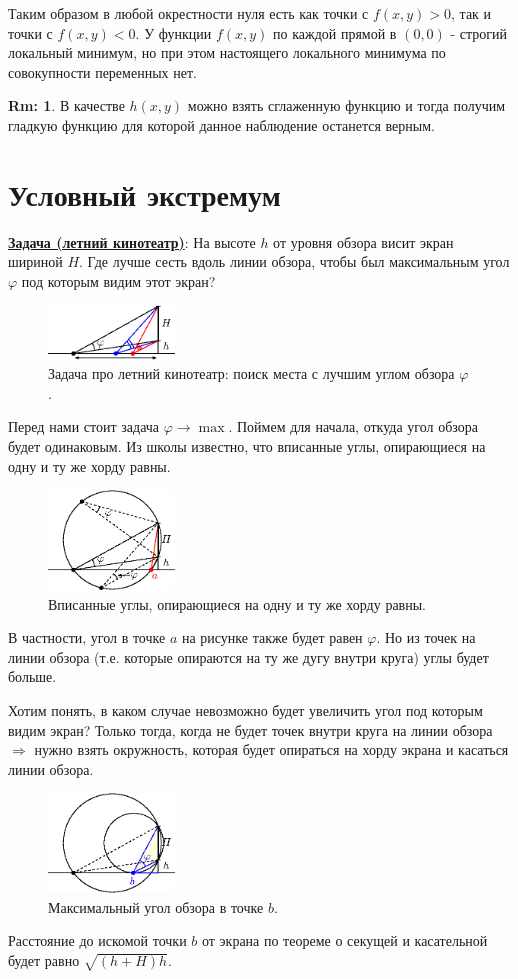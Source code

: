 \documentclass[12pt]{article}
\theoremstyle{definition}
\newtheorem{rem}{Rm:}
\begin{document}
Таким образом в любой окрестности нуля есть как точки с $f(x,y) > 0$, так и точки с $f(x,y) < 0$. У функции $f(x,y)$ по каждой прямой в $(0,0)$ - строгий локальный минимум, но при этом настоящего локального минимума по совокупности переменных нет.
\begin{rem}
	В качестве $h(x,y)$ можно взять сглаженную функцию и тогда получим гладкую функцию для которой данное наблюдение останется верным.
\end{rem}

\section*{Условный экстремум}
\textbf{\uline{Задача (летний кинотеатр)}}: На высоте $h$ от уровня обзора висит экран шириной $H$. Где лучше сесть вдоль линии обзора, чтобы был максимальным угол $\varphi$ под которым видим этот экран?
\begin{figure}[H]
	\centering
	\includegraphics[width=0.3\textwidth]{18_5.eps}
	\caption{Задача про летний кинотеатр: поиск места с лучшим углом обзора $\varphi$.}
	\label{18_5}
\end{figure}
Перед нами стоит задача $\varphi \to \max$. Поймем для начала, откуда угол обзора будет одинаковым. Из школы известно, что вписанные углы, опирающиеся на одну и ту же хорду равны.
\begin{figure}[H]
	\centering
	\includegraphics[width=0.3\textwidth]{18_6.eps}
	\caption{Вписанные углы, опирающиеся на одну и ту же хорду равны.}
	\label{18_6}
\end{figure}
В частности, угол в точке $a$ на рисунке также будет равен $\varphi$. Но из точек на линии обзора (т.е. которые опираются на ту же дугу внутри круга) углы будет больше. 

Хотим понять, в каком случае невозможно будет увеличить угол под которым видим экран? Только тогда, когда не будет точек внутри круга на линии обзора $\Rightarrow$ нужно взять окружность, которая будет опираться на хорду экрана и касаться линии обзора.
\begin{figure}[H]
	\centering
	\includegraphics[width=0.3\textwidth]{18_7.eps}
	\caption{Максимальный угол обзора в точке $b$.}
	\label{18_7}
\end{figure}
Расстояние до искомой точки $b$ от экрана по теореме о секущей и касательной будет равно $\sqrt{(h+H)h}$.
\end{document}
